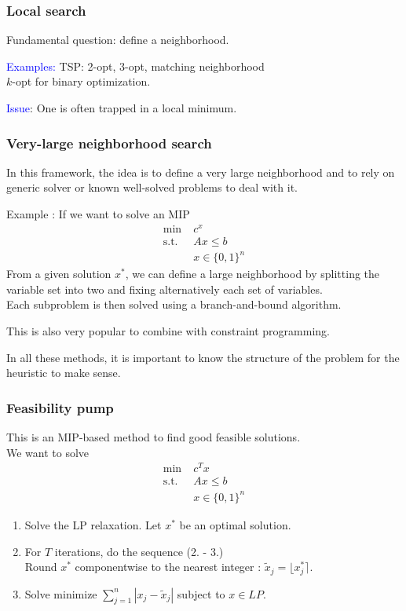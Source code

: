 \documentclass[9pt]{beamer}
\begin{document}
\begin{frame}
\frametitle{Local search}
Fundamental question: define a \alert{neighborhood}.\bigskip

\textcolor{blue}{Examples:} TSP: 2-opt, 3-opt, matching neighborhood\\
$k$-opt for binary optimization.\bigskip

\textcolor{blue}{Issue}: One is often trapped in a local minimum.
\end{frame}
\begin{frame}
\frametitle{Very-large neighborhood search}
In this framework, the idea is to define a \alert{very large neighborhood}
and to rely on generic solver or known well-solved problems to deal with it.\bigskip

\alert{Example} : If we want to solve an MIP
\begin{align*}
\min \;& c^x\\
\text{s.t. }\;& Ax\leq b\\
& x\in \{0,1\}^n
\end{align*}
From a given solution $x^*$, we can define a large neighborhood 
by splitting the variable set into two and \alert{fixing alternatively} each set of variables.\\
Each subproblem is then solved using a branch-and-bound algorithm.\bigskip

This is also very popular to combine with \alert{constraint programming}.\bigskip

In all these methods, it is important to know the \alert{structure} of the problem 
for the heuristic to make sense.
\end{frame}
\begin{frame}
\frametitle{Feasibility pump}
This is an MIP-based method to find good \alert{feasible solutions}.\\
We want to solve \begin{align*}
\min \;& c^Tx\\
\text{s.t. }\;& Ax\leq b\\
& x\in \{0,1\}^n
\end{align*}
\begin{enumerate}[1.]
\item Solve the LP relaxation.
Let $x^*$ be an optimal solution.\medskip
\item For $T$ iterations, do the sequence (2. - 3.)\\
Round $x^*$ componentwise to the nearest integer : $\tilde x_j = \lfloor x_j^* \rceil.$\medskip
\item Solve  minimize $\sum_{j=1}^n |x_j-\tilde x_j|$ subject to $x\in LP.$
\end{enumerate}
\end{frame}
\end{document}
